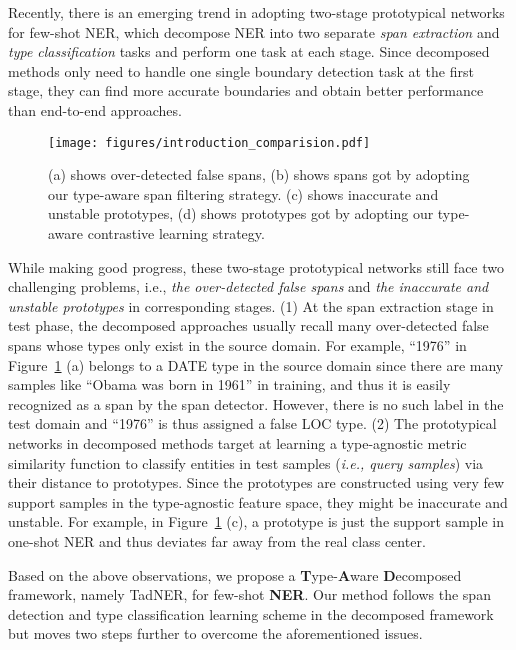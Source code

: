 \documentclass[11pt]{article}
\newcommand{\ours}{{TadNER}\xspace}
\begin{document}
Recently, there is an emerging trend in adopting two-stage prototypical networks~\cite{wang-2022-enhanced,ma-etal-2022-decomposed} for few-shot NER, which decompose NER into two separate \emph{span extraction} and \emph{type classification} tasks and perform one task at each stage.
Since decomposed methods only need to handle one single boundary detection task at the first stage, they can find more accurate boundaries and obtain better performance than end-to-end approaches.

\begin{figure}[t!]
\centering
\texttt{[image: figures/introduction\_comparision.pdf]}
\caption{(a) shows  over-detected false spans, (b) shows  spans got by adopting our type-aware span filtering  strategy.
(c) shows  inaccurate and unstable prototypes, (d) shows  prototypes got by adopting our  type-aware contrastive learning strategy.
}
\label{fig_introduction_comparision}
\vspace{-3mm}
\end{figure}

While making good progress, these two-stage  prototypical networks still face two challenging problems, i.e., \emph{the over-detected false spans}  and \emph{the inaccurate and unstable prototypes} in corresponding stages.
(1) At the span extraction stage in test phase, the decomposed approaches usually recall many over-detected false spans whose types only exist in the source domain. For example, ``1976'' in Figure~\ref{fig_introduction_comparision} (a) belongs to a DATE type in the source domain since there are many samples like ``Obama was born in 1961'' in training, and thus it is easily recognized as a span by the span detector. However, there is no such label in the test domain and ``1976'' is thus assigned a false LOC type.
(2) The  prototypical networks in decomposed methods target at learning a type-agnostic metric similarity function to classify entities in test samples (\emph{i.e., query samples}) via their distance to prototypes.
Since the prototypes are constructed using very few support samples in the type-agnostic feature space, they might be inaccurate and unstable. For example, in Figure~\ref{fig_introduction_comparision} (c), a prototype is just the support sample in one-shot NER and thus deviates far away from the real class center.




Based on the above observations, we propose a \textbf{T}ype-\textbf{A}ware \textbf{D}ecomposed framework, namely \ours,  for few-shot \textbf{NER}. Our method follows the span detection and type classification learning scheme in the decomposed framework but moves two steps further to overcome the aforementioned issues.
\end{document}
